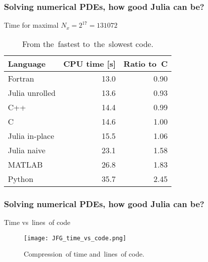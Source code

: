 \documentclass{beamer}  %
\begin{document}
\begin{frame}
  \frametitle{Solving numerical PDEs, how good Julia can be?}

  \begin{block}{Time for maximal $N_{ x } = 2^{ 17 } = 131072$}
    \begin{table}
      \centering
      
      \begin{tabular}{|l|r|r|}
        \hline
        Language & CPU time [s] & Ratio to~C \\
        \hline
        Fortran & 13.0 & 0.90 \\
        \hline
        Julia unrolled & 13.6 & 0.93 \\
        \hline
        C++ & 14.4 & 0.99 \\
        \hline
        C & 14.6 & 1.00 \\
        \hline
        Julia in-place & 15.5 & 1.06 \\
        \hline
        Julia naive & 23.1 & 1.58 \\
        \hline
        MATLAB & 26.8 & 1.83 \\
        \hline
        Python & 35.7 & 2.45 \\
        \hline
      \end{tabular}
      \caption{From the~fastest to~the~slowest code.}
    \end{table}
  \end{block}

\end{frame}





\begin{frame}
  \frametitle{Solving numerical PDEs, how good Julia can be?}

  \begin{block}{Time vs~lines~of code}
    \begin{figure}
      \centering

      \texttt{[image: JFG\_time\_vs\_code.png]}
      \caption{Compression~of time and~lines~of code.}
    \end{figure}
  \end{block}

\end{frame}
\end{document}
